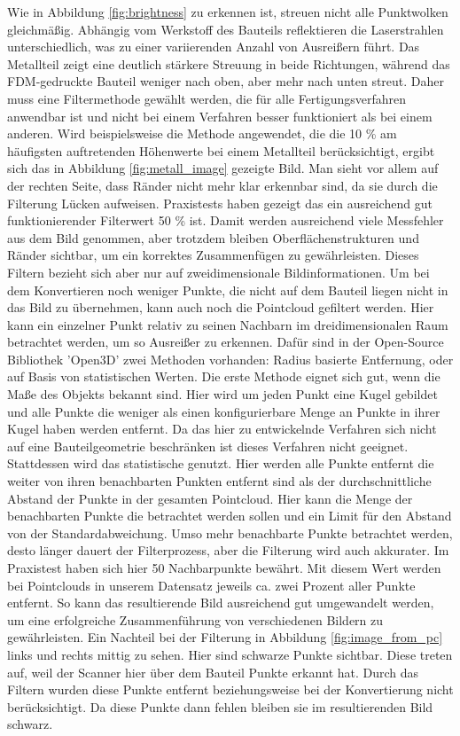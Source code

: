 Wie in Abbildung \ref{fig:brightness} zu erkennen ist, streuen nicht alle Punktwolken
gleichmäßig. Abhängig vom Werkstoff des Bauteils reflektieren die Laserstrahlen 
unterschiedlich, was zu einer variierenden Anzahl von Ausreißern führt. 
Das Metallteil zeigt eine deutlich stärkere Streuung in beide Richtungen, 
während das FDM-gedruckte Bauteil weniger nach oben, 
aber mehr nach unten streut. Daher muss eine Filtermethode gewählt werden, 
die für alle Fertigungsverfahren anwendbar ist und nicht bei einem Verfahren 
besser funktioniert als bei einem anderen. Wird beispielsweise die Methode angewendet, 
die die 10 \% am häufigsten auftretenden Höhenwerte bei einem Metallteil berücksichtigt, 
ergibt sich das in Abbildung \ref{fig:metall_image} gezeigte Bild.
Man sieht vor allem auf der rechten Seite, dass Ränder nicht mehr klar erkennbar sind, 
da sie durch die Filterung Lücken aufweisen. Praxistests haben gezeigt das ein 
ausreichend gut funktionierender Filterwert 50 \% ist. Damit werden 
ausreichend viele Messfehler aus dem Bild genommen,
aber trotzdem bleiben Oberflächenstrukturen und Ränder
sichtbar, um ein korrektes Zusammenfügen zu gewährleisten.
Dieses Filtern bezieht sich aber nur auf zweidimensionale Bildinformationen.
Um bei dem Konvertieren noch weniger Punkte,
die nicht auf dem Bauteil liegen nicht in das Bild zu übernehmen, 
kann auch noch die Pointcloud gefiltert werden.
Hier kann ein einzelner Punkt relativ zu seinen Nachbarn im dreidimensionalen 
Raum betrachtet werden, um so Ausreißer zu erkennen. Dafür sind in der Open-Source
Bibliothek 'Open3D' zwei Methoden vorhanden: Radius basierte Entfernung,
oder auf Basis von statistischen Werten.
Die erste Methode eignet sich gut, wenn die Maße des Objekts bekannt
sind. Hier wird um jeden Punkt eine Kugel gebildet und alle Punkte die weniger als 
einen konfigurierbare Menge an Punkte in ihrer Kugel haben werden entfernt. Da 
das hier zu entwickelnde Verfahren sich nicht auf eine Bauteilgeometrie beschränken
ist dieses Verfahren nicht geeignet. Stattdessen wird das statistische genutzt. 
Hier werden alle Punkte entfernt die weiter von ihren benachbarten Punkten entfernt
sind als der durchschnittliche Abstand der Punkte in der gesamten Pointcloud. 
Hier kann die Menge der benachbarten Punkte die betrachtet werden sollen und
ein Limit für den Abstand von der Standardabweichung. 
Umso mehr benachbarte Punkte betrachtet werden, desto länger dauert der Filterprozess, 
aber die Filterung wird auch akkurater. Im Praxistest haben sich
hier 50 Nachbarpunkte bewährt. Mit diesem Wert werden bei Pointclouds in unserem 
Datensatz jeweils ca. zwei Prozent aller Punkte entfernt. So kann das resultierende
Bild ausreichend gut umgewandelt werden, um eine erfolgreiche Zusammenführung 
von verschiedenen Bildern zu gewährleisten.
Ein Nachteil bei der Filterung in Abbildung \ref{fig:image_from_pc} links und rechts 
mittig zu sehen. Hier sind schwarze Punkte sichtbar. Diese treten auf, weil der Scanner
hier über dem Bauteil Punkte erkannt hat. Durch das Filtern wurden diese Punkte entfernt
beziehungsweise bei der Konvertierung nicht berücksichtigt. Da diese Punkte dann fehlen
bleiben sie im resultierenden Bild schwarz.

